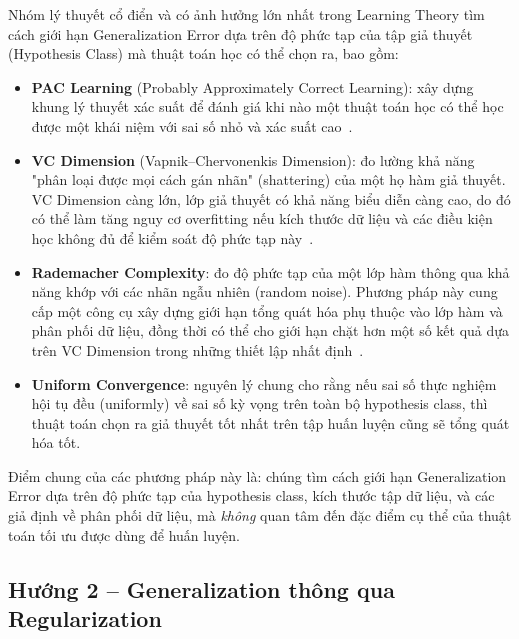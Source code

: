 Nhóm lý thuyết cổ điển và có ảnh hưởng lớn nhất trong Learning Theory tìm cách giới hạn Generalization Error dựa trên độ phức tạp của tập giả thuyết (Hypothesis Class) mà thuật toán học có thể chọn ra, bao gồm:
\begin{itemize}
    \item \textbf{PAC Learning} (Probably Approximately Correct Learning): xây dựng khung lý thuyết xác suất để đánh giá khi nào một thuật toán học có thể học được một khái niệm với sai số nhỏ và xác suất cao~\cite{vapnik1998statistical}.
    \item \textbf{VC Dimension} (Vapnik--Chervonenkis Dimension): đo lường khả năng "phân loại được mọi cách gán nhãn" (shattering) của một họ hàm giả thuyết. VC Dimension càng lớn, lớp giả thuyết có khả năng biểu diễn càng cao, do đó có thể làm tăng nguy cơ overfitting nếu kích thước dữ liệu và các điều kiện học không đủ để kiểm soát độ phức tạp này~\cite{vapnik1998statistical}.
    \item \textbf{Rademacher Complexity}: đo độ phức tạp của một lớp hàm thông qua khả năng khớp với các nhãn ngẫu nhiên (random noise). Phương pháp này cung cấp một công cụ xây dựng giới hạn tổng quát hóa phụ thuộc vào lớp hàm và phân phối dữ liệu, đồng thời có thể cho giới hạn chặt hơn một số kết quả dựa trên VC Dimension trong những thiết lập nhất định~\cite{mohri2018foundations}.
    \item \textbf{Uniform Convergence}: nguyên lý chung cho rằng nếu sai số thực nghiệm hội tụ đều (uniformly) về sai số kỳ vọng trên toàn bộ hypothesis class, thì thuật toán chọn ra giả thuyết tốt nhất trên tập huấn luyện cũng sẽ tổng quát hóa tốt.
\end{itemize}
Điểm chung của các phương pháp này là: chúng tìm cách giới hạn Generalization Error dựa trên độ phức tạp của hypothesis class, kích thước tập dữ liệu, và các giả định về phân phối dữ liệu, mà \emph{không} quan tâm đến đặc điểm cụ thể của thuật toán tối ưu được dùng để huấn luyện.

\subsection{Hướng 2 -- Generalization thông qua Regularization}

